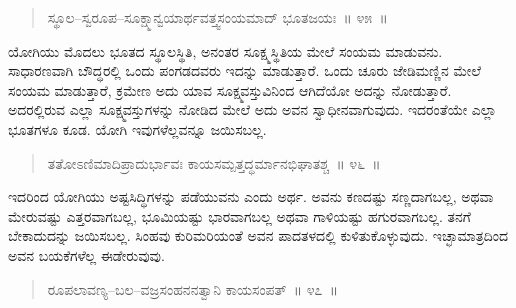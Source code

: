 \vspace{-0.25cm}

\begin{verse}
ಸ್ಥೂಲ–ಸ್ವರೂಪ–ಸೂಕ್ಷ್ಮಾನ್ವಯಾರ್ಥವತ್ತ್ವಸಂಯಮಾದ್​ ಭೂತಜಯಃ~॥ ೪೫~॥
\end{verse}

\vspace{-0.4cm}


\vspace{0.1cm}

ಯೋಗಿಯು ಮೊದಲು ಭೂತದ ಸ್ಥೂಲಸ್ಥಿತಿ, ಅನಂತರ ಸೂಕ್ಷ್ಮಸ್ಥಿತಿಯ ಮೇಲೆ ಸಂಯಮ ಮಾಡುವನು. ಸಾಧಾರಣವಾಗಿ ಬೌದ್ಧರಲ್ಲಿ ಒಂದು ಪಂಗಡದವರು ಇದನ್ನು ಮಾಡುತ್ತಾರೆ. ಒಂದು ಚೂರು ಜೇಡಿಮಣ್ಣಿನ ಮೇಲೆ ಸಂಯಮ ಮಾಡುತ್ತಾರೆ, ಕ್ರಮೇಣ ಅದು ಯಾವ ಸೂಕ್ಷ್ಮವಸ್ತುವಿನಿಂದ ಆಗಿದೆಯೋ ಅದನ್ನು ನೋಡುತ್ತಾರೆ. ಅದರಲ್ಲಿರುವ ಎಲ್ಲಾ ಸೂಕ್ಷ್ಮವಸ್ತುಗಳನ್ನು ನೋಡಿದ ಮೇಲೆ ಅದು ಅವನ ಸ್ವಾಧೀನವಾಗುವುದು. ಇದರಂತೆಯೇ ಎಲ್ಲಾ ಭೂತಗಳೂ ಕೂಡ. ಯೋಗಿ ಇವುಗಳೆಲ್ಲವನ್ನೂ ಜಯಿಸಬಲ್ಲ. 

\vspace{-0.25cm}

\begin{verse}
ತತೋಽಣಿಮಾದಿಪ್ರಾದುರ್ಭಾವಃ ಕಾಯಸಮ್ಪತ್ತದ್ಧರ್ಮಾನಭಿಘಾತಶ್ಚ~॥ ೪೬~॥
\end{verse}

\vspace{-0.4cm}


\vspace{0.1cm}

ಇದರಿಂದ ಯೋಗಿಯು ಅಷ್ಟಸಿದ್ಧಿಗಳನ್ನು ಪಡೆಯುವನು ಎಂದು ಅರ್ಥ. ಅವನು ಕಣದಷ್ಟು ಸಣ್ಣದಾಗಬಲ್ಲ, ಅಥವಾ ಮೇರುವಷ್ಟು ಎತ್ತರವಾಗಬಲ್ಲ, ಭೂಮಿಯಷ್ಟು ಭಾರವಾಗಬಲ್ಲ ಅಥವಾ ಗಾಳಿಯಷ್ಟು ಹಗುರವಾಗಬಲ್ಲ. ತನಗೆ ಬೇಕಾದುದನ್ನು ಜಯಿಸಬಲ್ಲ. ಸಿಂಹವು ಕುರಿಮರಿಯಂತೆ ಅವನ ಪಾದತಳದಲ್ಲಿ ಕುಳಿತುಕೊಳ್ಳುವುದು. ಇಚ್ಛಾಮಾತ್ರದಿಂದ ಅವನ ಬಯಕೆಗಳೆಲ್ಲ ಈಡೇರುವುವು. 

\vspace{-0.25cm}

\begin{verse}
ರೂಪಲಾವಣ್ಯ–ಬಲ–ವಜ್ರಸಂಹನನತ್ವಾನಿ ಕಾಯಸಂಪತ್​~॥ ೪೭~॥
\end{verse}

\vspace{-0.4cm}


\vspace{0.1cm}

